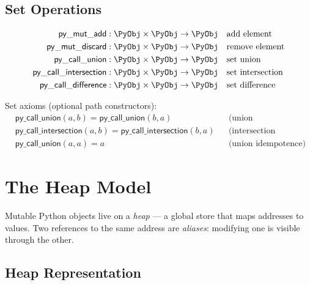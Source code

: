 \subsection{Set Operations}

\begin{definition}
\begin{align}
  \mathsf{py\_mut\_add} &: \PyObj \times \PyObj \to \PyObj
    && \text{add element} \\
  \mathsf{py\_mut\_discard} &: \PyObj \times \PyObj \to \PyObj
    && \text{remove element} \\
  \mathsf{py\_call\_union} &: \PyObj \times \PyObj \to \PyObj
    && \text{set union} \\
  \mathsf{py\_call\_intersection} &: \PyObj \times \PyObj \to \PyObj
    && \text{set intersection} \\
  \mathsf{py\_call\_difference} &: \PyObj \times \PyObj \to \PyObj
    && \text{set difference}
\end{align}
\end{definition}

Set axioms (optional path constructors):
\begin{align}
  &\mathsf{py\_call\_union}(a, b) = \mathsf{py\_call\_union}(b, a)
    && \text{(union commutativity)} \\
  &\mathsf{py\_call\_intersection}(a, b) =
    \mathsf{py\_call\_intersection}(b, a)
    && \text{(intersection commutativity)} \\
  &\mathsf{py\_call\_union}(a, a) = a
    && \text{(union idempotence)}
\end{align}


\section{The Heap Model}

Mutable Python objects live on a \emph{heap} --- a global store that
maps addresses to values.  Two references to the same address are
\emph{aliases}: modifying one is visible through the other.

\subsection{Heap Representation}

